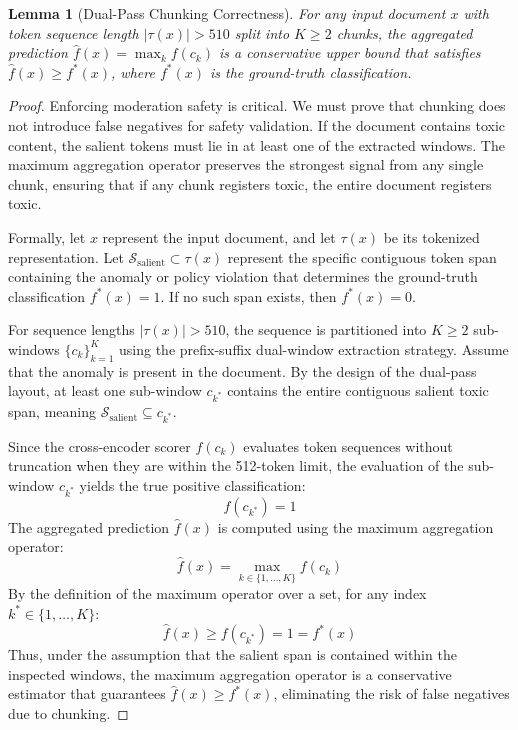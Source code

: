 \documentclass[11pt,a4paper]{article}
\theoremstyle{plain}
\newtheorem{lemma}[theorem]{Lemma}
\theoremstyle{definition}
\theoremstyle{remark}
\begin{document}
\begin{lemma}[Dual-Pass Chunking Correctness]\label{lem:chunk}
For any input document $x$ with token sequence length $|\tau(x)| > 510$ split into $K \ge 2$ chunks, the aggregated prediction $\hat f(x) = \max_k f(c_k)$ is a conservative upper bound that satisfies $\hat f(x) \ge f^*(x)$, where $f^*(x)$ is the ground-truth classification.
\end{lemma}
\begin{proof}
Enforcing moderation safety is critical. We must prove that chunking does not introduce false negatives for safety validation. If the document contains toxic content, the salient tokens must lie in at least one of the extracted windows. The maximum aggregation operator preserves the strongest signal from any single chunk, ensuring that if any chunk registers toxic, the entire document registers toxic.

Formally, let $x$ represent the input document, and let $\tau(x)$ be its tokenized representation. Let $\mathcal{S}_{\text{salient}} \subset \tau(x)$ represent the specific contiguous token span containing the anomaly or policy violation that determines the ground-truth classification $f^*(x) = 1$. If no such span exists, then $f^*(x) = 0$.

For sequence lengths $|\tau(x)| > 510$, the sequence is partitioned into $K \ge 2$ sub-windows $\{c_k\}_{k=1}^K$ using the prefix-suffix dual-window extraction strategy. Assume that the anomaly is present in the document. By the design of the dual-pass layout, at least one sub-window $c_{k^*}$ contains the entire contiguous salient toxic span, meaning $\mathcal{S}_{\text{salient}} \subseteq c_{k^*}$.

Since the cross-encoder scorer $f(c_k)$ evaluates token sequences without truncation when they are within the 512-token limit, the evaluation of the sub-window $c_{k^*}$ yields the true positive classification:
$$f(c_{k^*}) = 1$$
The aggregated prediction $\hat{f}(x)$ is computed using the maximum aggregation operator:
$$\hat{f}(x) = \max_{k \in \{1,\dots,K\}} f(c_k)$$
By the definition of the maximum operator over a set, for any index $k^* \in \{1,\dots,K\}$:
$$\hat{f}(x) \ge f(c_{k^*}) = 1 = f^*(x)$$
Thus, under the assumption that the salient span is contained within the inspected windows, the maximum aggregation operator is a conservative estimator that guarantees $\hat{f}(x) \ge f^*(x)$, eliminating the risk of false negatives due to chunking.
\end{proof}
\end{document}
